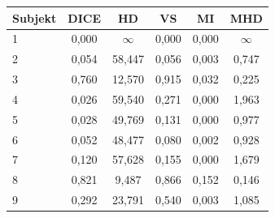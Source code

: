 \begin{tabular}{l c c c c c}
 \hline
Subjekt & DICE & HD & VS & MI & MHD \\ \hline
1 & 0,000 & $\infty$ & 0,000 & 0,000 & $\infty$ \\
2 & 0,054 & 58,447 & 0,056 & 0,003 & 0,747 \\
3 & 0,760 & 12,570 & 0,915 & 0,032 & 0,225 \\
4 & 0,026 & 59,540 & 0,271 & 0,000 & 1,963 \\
5 & 0,028 & 49,769 & 0,131 & 0,000 & 0,977 \\
6 & 0,052 & 48,477 & 0,080 & 0,002 & 0,928 \\
7 & 0,120 & 57,628 & 0,155 & 0,000 & 1,679 \\
8 & 0,821 & 9,487 & 0,866 & 0,152 & 0,146 \\
9 & 0,292 & 23,791 & 0,540 & 0,003 & 1,085 \\
\hline 
 \end{tabular}
